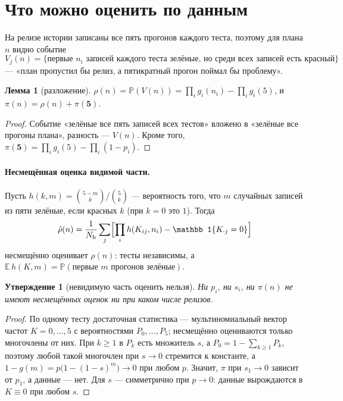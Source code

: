 \documentclass[11pt,a4paper]{article}
\newcommand{\E}{\mathbb{E}}
\newcommand{\Prob}{\mathbb{P}}
\theoremstyle{plain}
\newtheorem{proposition}{Утверждение}
\theoremstyle{definition}
\newtheorem{lemma}{Лемма}
\begin{document}
\section{Что можно оценить по данным}

На релизе истории записаны все пять прогонов каждого теста, поэтому для плана $n$ видно событие
\[
V_j(n)=\{\text{первые $n_i$ записей каждого теста зелёные, но среди всех записей есть красный}\}
\]
--- «план пропустил бы релиз, а пятикратный прогон поймал бы проблему».

\begin{lemma}[разложение]
$\rho(n)=\Prob(V(n))=\prod_ig_i(n_i)-\prod_ig_i(5)$, и $\pi(n)=\rho(n)+\pi(\mathbf5)$.
\end{lemma}

\begin{proof}
Событие «зелёные все пять записей всех тестов» вложено в «зелёные все прогоны плана», разность --- $V(n)$. Кроме того, $\pi(\mathbf5)=\prod_ig_i(5)-\prod_i(1-p_i)$.
\end{proof}

\paragraph{Несмещённая оценка видимой части.} Пусть $h(k,m)=\binom{5-m}{k}\big/\binom5k$ --- вероятность того, что $m$ случайных записей из пяти зелёные, если красных $k$ (при $k=0$ это $1$). Тогда
\[
\hat\rho(n)=\frac1{N_{\rm h}}\sum_j\Bigl[\prod_ih(K_{ij},n_i)-\mathbb 1\{K_{\cdot j}=0\}\Bigr]
\]
несмещённо оценивает $\rho(n)$: тесты независимы, а $\E\,h(K,m)=\Prob(\text{первые $m$ прогонов зелёные})$.

\begin{proposition}[невидимую часть оценить нельзя]
Ни $p_i$, ни $s_i$, ни $\pi(n)$ не имеют несмещённых оценок ни при каком числе релизов.
\end{proposition}

\begin{proof}
По одному тесту достаточная статистика --- мультиномиальный вектор частот $K=0,\dots,5$ с вероятностями $P_0,\dots,P_5$; несмещённо оцениваются только многочлены от них. При $k\ge1$ в $P_k$ есть множитель $s$, а $P_0=1-\sum_{k\ge1}P_k$, поэтому любой такой многочлен при $s\to0$ стремится к константе, а $1-g(m)=p\bigl(1-(1-s)^m\bigr)\to0$ при любом $p$. Значит, $\pi$ при $s_1\to0$ зависит от $p_1$, а данные --- нет. Для $s$ --- симметрично при $p\to0$: данные вырождаются в $K\equiv0$ при любом $s$.
\end{proof}
\end{document}
